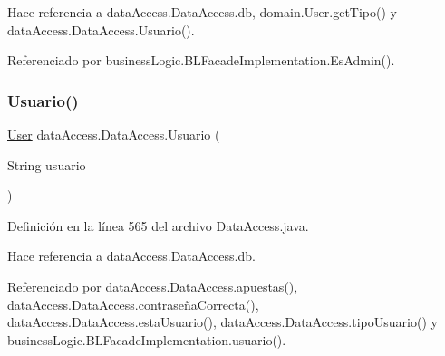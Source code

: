 Hace referencia a data\+Access.\+Data\+Access.\+db, domain.\+User.\+get\+Tipo() y data\+Access.\+Data\+Access.\+Usuario().



Referenciado por business\+Logic.\+B\+L\+Facade\+Implementation.\+Es\+Admin().

\mbox{\label{classdataAccess_1_1DataAccess_a081df9fe42a2191febb4ff4f28a15f96}} 
\subsubsection{\texorpdfstring{Usuario()}{Usuario()}}
{\footnotesize\ttfamily \mbox{\hyperlink{classdomain_1_1User}{User}} data\+Access.\+Data\+Access.\+Usuario (\begin{DoxyParamCaption}\item[{String}]{usuario }\end{DoxyParamCaption})}



Definición en la línea 565 del archivo Data\+Access.\+java.


\begin{DoxyCode}{0}

\end{DoxyCode}


Hace referencia a data\+Access.\+Data\+Access.\+db.



Referenciado por data\+Access.\+Data\+Access.\+apuestas(), data\+Access.\+Data\+Access.\+contraseña\+Correcta(), data\+Access.\+Data\+Access.\+esta\+Usuario(), data\+Access.\+Data\+Access.\+tipo\+Usuario() y business\+Logic.\+B\+L\+Facade\+Implementation.\+usuario().

